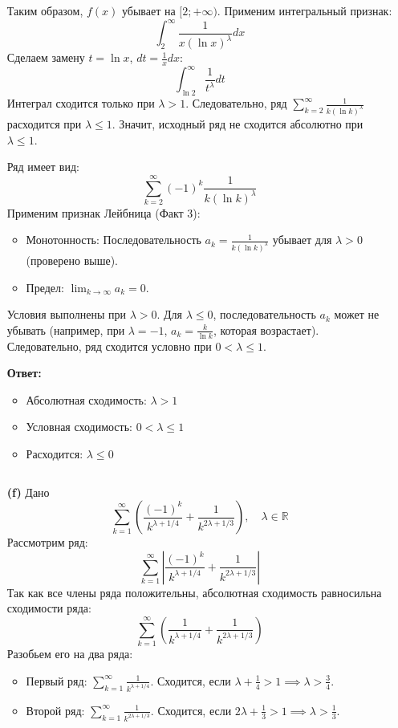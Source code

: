 \documentclass[a4paper]{article}
\renewcommand{\leq}{\leqslant}
\begin{document}
\begin{enumerate}
Таким образом, \( f(x) \) убывает на \( [2; +\infty) \). Применим интегральный признак:
\[
\int_{2}^{\infty} \frac{1}{x (\ln x)^\lambda} dx
\]
Сделаем замену \( t = \ln x \), \( dt = \frac{1}{x} dx \):
\[
\int_{\ln 2}^{\infty} \frac{1}{t^\lambda} dt
\]
Интеграл сходится только при \( \lambda > 1 \). Следовательно, ряд 
\( \sum_{k=2}^{\infty} \frac{1}{k (\ln k)^\lambda} \) 
расходится при \( \lambda \leq 1 \). Значит, исходный ряд не сходится абсолютно при 
\( \lambda \leq 1 \).

Ряд имеет вид:
\[
\sum_{k=2}^{\infty} (-1)^k \frac{1}{k (\ln k)^\lambda}
\]
Применим признак Лейбница (Факт 3):
\begin{itemize}
\item Монотонность: Последовательность \( a_k = \frac{1}{k (\ln k)^\lambda} \)
убывает для \( \lambda > 0 \) (проверено выше).
\item Предел: \( \lim_{k \to \infty} a_k = 0 \).
\end{itemize}

Условия выполнены при \( \lambda > 0 \). Для \( \lambda \leq 0 \), 
последовательность \( a_k \) может не убывать (например, при \( \lambda = -1 \),
\( a_k = \frac{k}{\ln k} \), которая возрастает). Следовательно, ряд 
сходится условно при \( 0 < \lambda \leq 1 \).

\textbf{Ответ:}
\begin{itemize}
\item Абсолютная сходимость: \( \lambda > 1 \)
\item Условная сходимость: \( 0 < \lambda \leq 1 \)
\item Расходится: \( \lambda \leq 0 \)
\end{itemize}$\;$

\item[\textbf{(f)}]Дано
\[
\sum_{k=1}^{\infty} \left( \frac{(-1)^k}{k^{\lambda + 1/4}} + 
\frac{1}{k^{2\lambda + 1/3}} \right), \quad \lambda \in \mathbb{R}
\]
Рассмотрим ряд:
\[
\sum_{k=1}^{\infty} \left| \frac{(-1)^k}{k^{\lambda + 1/4}} + 
\frac{1}{k^{2\lambda + 1/3}} \right|
\]
Так как все члены ряда положительны, абсолютная сходимость равносильна сходимости ряда:
\[
\sum_{k=1}^{\infty} \left( \frac{1}{k^{\lambda + 1/4}} + 
\frac{1}{k^{2\lambda + 1/3}} \right)
\]
Разобьем его на два ряда:
\begin{itemize}
\item Первый ряд: \(\sum_{k=1}^{\infty} \frac{1}{k^{\lambda + 1/4}}\). 
Сходится, если \(\lambda + \frac{1}{4} > 1 \implies \lambda > \frac{3}{4}\).
\item Второй ряд: \(\sum_{k=1}^{\infty} \frac{1}{k^{2\lambda + 1/3}}\). 
Сходится, если \(2\lambda + \frac{1}{3} > 1 \implies \lambda > \frac{1}{3}\).
\end{itemize}


\end{enumerate}
\end{document}
